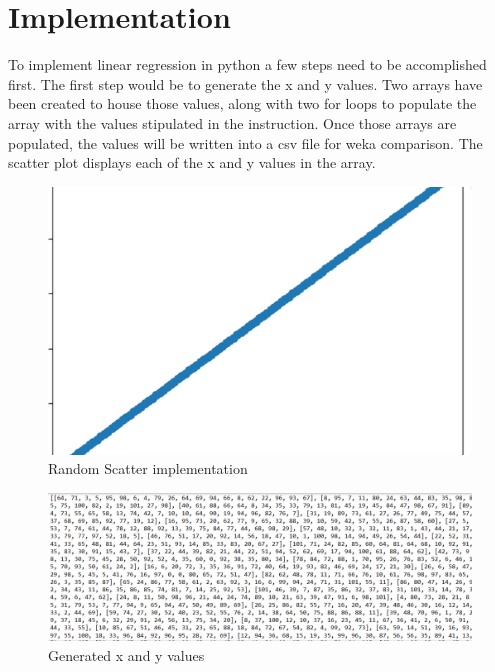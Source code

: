\documentclass{article}
\begin{document}
\section{Implementation}
To implement linear regression in python a few steps need to be accomplished first. The first step would be to generate the x and y values. Two arrays have been created to house those values, along with two for loops to populate the array with the values stipulated in the instruction. Once those arrays are populated, the values will be written into a csv file for weka comparison.
The scatter plot displays each of the x and y values in the array.
\begin{figure}
    \centering
    \includegraphics[width=0.5\linewidth]{image09.png}
    \caption{Random Scatter implementation}
    \label{fig:enter-label}
\end{figure}
\begin{figure}
    \centering
    \includegraphics[width=0.5\linewidth]{please.png}
    \caption{Generated x and y values}
    \label{fig:enter-label}
\end{figure}
\end{document}
